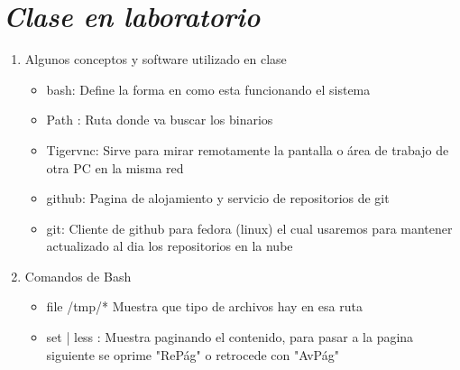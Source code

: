 \documentclass{book}
\begin{document}



\section{\textit{Clase en laboratorio}}%
\begin{flushright}
	\date{08 de enero de 2019}
\end{flushright}

\begin{enumerate}%
	
	\item Algunos conceptos y software utilizado en clase%
	\begin{itemize}
		\item bash: Define la forma en como esta funcionando el sistema
		\item Path : Ruta donde va buscar los binarios
		\item Tigervnc: Sirve para mirar remotamente la pantalla o área de trabajo de otra PC en la misma red
		\item github: Pagina de alojamiento y servicio de repositorios de git
		\item git: Cliente de github para fedora (linux) el cual usaremos para mantener actualizado al dia los repositorios en la nube
		
	\end{itemize}
	
	\item Comandos de Bash%
	\begin{itemize}%
		\item file /tmp/* Muestra que tipo de archivos hay en esa ruta
		\item set | less : Muestra paginando el contenido, para pasar a la pagina siguiente se oprime "RePág" o retrocede con "AvPág"
		

\end{itemize}
\end{enumerate}
\end{document}
